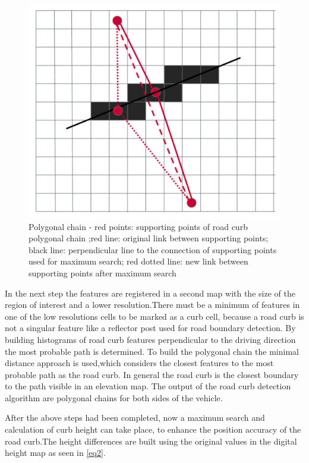 \documentclass[conference]{IEEEtran}
\begin{document}
\begin{figure}[ht]
	\centering
    \includegraphics[scale = 0.3]{pictures/polygonal_chain.pdf}
	\caption{Polygonal chain - red points: supporting points of road curb polygonal chain ;red line: original link between supporting points; black line: perpendicular line to the connection of supporting points used for maximum search; red dotted line: new link between supporting points after maximum search \cite{stereo}}
	\label{fig7}
\end{figure}


In the next step the features are registered in a second map with the size of the region of interest and a lower resolution.There must be a minimum of features in one of the low resolutions cells to be marked as a curb cell, because a road curb is not a singular feature like a reflector post used for road boundary detection. By building histograms of road curb features perpendicular to the driving direction the most probable path is determined. To build the polygonal chain the minimal distance approach is used,which considers the closest features to the most probable path as the road curb. In general the road curb is the closest boundary to the path visible in an elevation map. The output of the road curb detection algorithm are polygonal chains for both sides of the vehicle.

After the above steps had been completed, now a maximum search and calculation of curb height can take place, to enhance the position accuracy of the road curb.The height differences are built using the original values in the digital height map as seen in \ref{eq2}.
\end{document}
